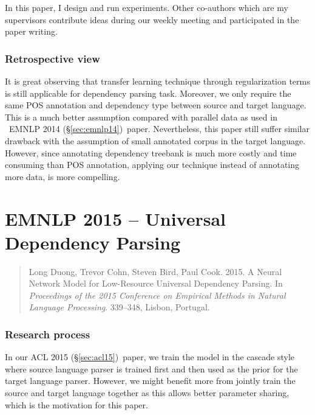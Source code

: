 \documentclass[12pt,twoside,final,hidelinks]{ltthesis}
\theoremstyle{definition}
\newcommand\emnlpiv{EMNLP 2014 (\S\ref{sec:emnlp14})}
\newcommand\aclv{ACL 2015 (\S\ref{sec:acl15})}
\begin{document}
In this paper, I design and run experiments. Other co-authors which are my supervisors contribute ideas during our weekly 
meeting and participated in the paper writing. 

\subsubsection{Retrospective view}
It is great observing that transfer learning technique through regularization terms is still applicable for dependency parsing task. Moreover, we only 
require the same POS annotation and dependency type between source and target language. This is a much better 
assumption compared with parallel data as used in ~\emnlpiv\ paper. Nevertheless, this paper still suffer similar drawback with the assumption of 
small annotated corpus in the target language. However, since annotating dependency treebank is much more costly and time consuming than POS annotation, 
applying our technique instead of annotating more data, is more compelling.  





\section{EMNLP 2015 -- Universal Dependency Parsing}
\label{sec:emnlp15}
\begin{quote}
Long Duong, Trevor Cohn, Steven Bird, Paul Cook. 2015. A Neural Network Model for Low-Resource Universal Dependency Parsing. In \textit{Proceedings of the 2015 Conference on Empirical Methods in Natural Language Processing}. 339--348, Lisbon, Portugal.
\end{quote}

\subsubsection{Research process}
In our \aclv\ paper, we train the model in the cascade style where source language parser is trained first and then used as the prior for the target language 
parser. However, we might benefit more from jointly train the source and target language together as this allows better 
parameter sharing, which is the motivation for this paper. 
\end{document}
